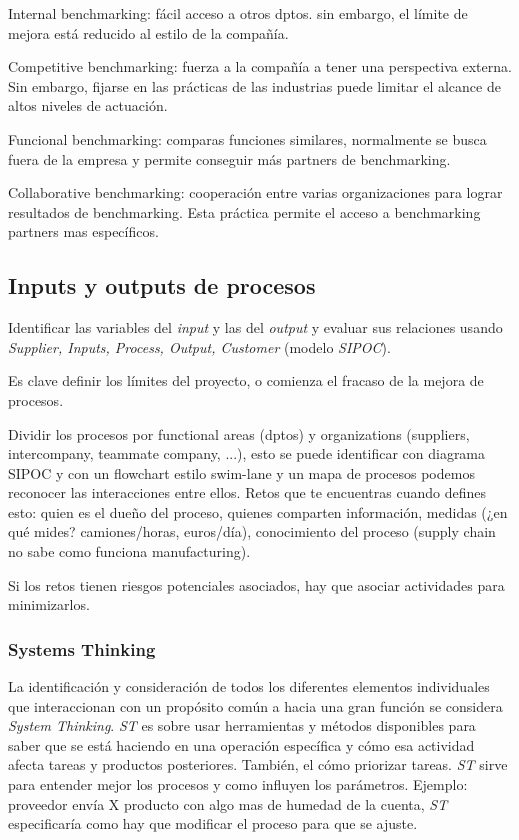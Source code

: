 \documentclass[]{article}
\begin{document}
Internal benchmarking: fácil acceso a otros dptos. sin embargo, el límite de mejora está reducido al estilo de la compañía.

Competitive benchmarking: fuerza a la compañía a tener una perspectiva externa. Sin embargo, fijarse en las prácticas de las industrias puede limitar el alcance de altos niveles de actuación.

Funcional benchmarking: comparas funciones similares, normalmente se busca fuera de la empresa y permite conseguir más partners de benchmarking.

Collaborative benchmarking: cooperación entre varias organizaciones para lograr resultados de benchmarking. Esta práctica permite el acceso a benchmarking partners  mas específicos.  

\subsection{Inputs y outputs de procesos}

Identificar las variables del \textit{input} y las del \textit{output} y evaluar sus relaciones usando \textit{Supplier, Inputs, Process, Output, Customer} (modelo \textit{SIPOC}).

Es clave definir los límites del proyecto, o comienza el fracaso de la mejora de procesos.

Dividir los procesos por functional areas (dptos) y organizations (suppliers, intercompany, teammate company, ...), esto se puede identificar con diagrama SIPOC y con un flowchart estilo swim-lane y un mapa de procesos podemos reconocer las interacciones entre ellos. Retos que te encuentras cuando defines esto: quien es el dueño del proceso, quienes comparten información, medidas (¿en qué mides? camiones/horas, euros/día), conocimiento del proceso (supply chain no sabe como funciona manufacturing).

Si los retos tienen riesgos potenciales asociados, hay que asociar actividades para minimizarlos.

\subsubsection{Systems Thinking}

La identificación y consideración de todos los diferentes elementos individuales que interaccionan con un propósito común a hacia una gran función se considera \textit{System Thinking}. \textit{ST} es sobre usar herramientas y métodos disponibles para saber que se está haciendo en una operación específica y cómo esa actividad afecta tareas y productos posteriores. También, el cómo priorizar tareas. \newline \textit{ST} sirve para entender mejor los procesos y como influyen los parámetros. \newline Ejemplo: proveedor envía X producto con algo mas de humedad de la cuenta, \textit{ST} especificaría como hay que modificar el proceso para que se ajuste. 
\end{document}
